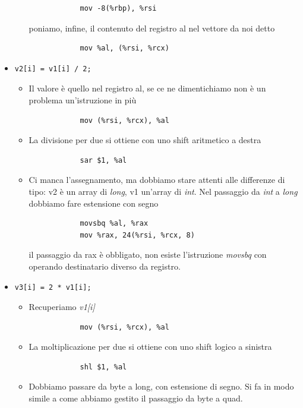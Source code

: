 \begin{itemize}
\begin{itemize}
\begin{verbatim}
			mov -8(%rbp), %rsi
		\end{verbatim}
		poniamo, infine, il contenuto del registro al nel vettore da noi detto
		\begin{verbatim}
			mov %al, (%rsi, %rcx)
		\end{verbatim}
	\end{itemize}
	\item \begin{verbatim}v2[i] = v1[i] / 2;\end{verbatim}
	\begin{itemize}
		\item Il valore è quello nel registro al, se ce ne dimentichiamo non è un problema un'istruzione in più
		\begin{verbatim}
			mov (%rsi, %rcx), %al
		\end{verbatim}
		\item La divisione per due si ottiene con uno shift aritmetico a destra
		\begin{verbatim}
			sar $1, %al
		\end{verbatim}
		\item Ci manca l'assegnamento, ma dobbiamo stare attenti alle differenze di tipo: v2 è un array di \emph{long}, v1 un'array di \emph{int}.  Nel passaggio da \emph{int} a \emph{long} dobbiamo fare estensione con segno
		\begin{verbatim}
			movsbq %al, %rax
			mov %rax, 24(%rsi, %rcx, 8)
		\end{verbatim}
		il passaggio da rax è obbligato, non esiste l'istruzione \emph{movsbq} con operando destinatario diverso da registro.
	\end{itemize}
	\item \begin{verbatim}v3[i] = 2 * v1[i];\end{verbatim}
	\begin{itemize}
		\item Recuperiamo \emph{v1[i]}
		\begin{verbatim}
			mov (%rsi, %rcx), %al
		\end{verbatim}
		\item La moltiplicazione per due si ottiene con uno shift logico a sinistra
		\begin{verbatim}
			shl $1, %al
		\end{verbatim} 
		\item Dobbiamo passare da byte a long, con estensione di segno. Si fa in modo simile a come abbiamo gestito il passaggio da byte a quad.
		\begin{verbatim}

\end{verbatim}
\end{itemize}
\end{itemize}
